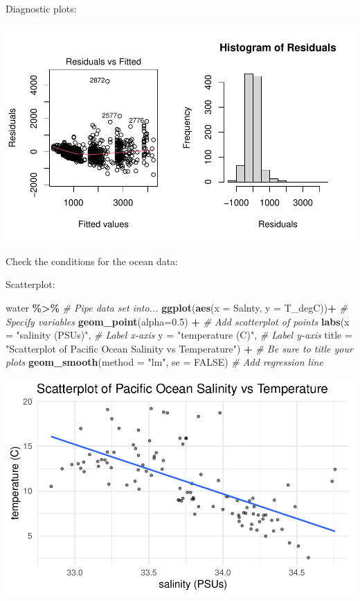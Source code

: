 \documentclass[
]{report}
\newenvironment{Shaded}{\begin{snugshade}}{\end{snugshade}}
\newcommand{\AttributeTok}[1]{\textcolor[rgb]{0.13,0.29,0.53}{#1}}
\newcommand{\CommentTok}[1]{\textcolor[rgb]{0.56,0.35,0.01}{\textit{#1}}}
\newcommand{\ConstantTok}[1]{\textcolor[rgb]{0.56,0.35,0.01}{#1}}
\newcommand{\FloatTok}[1]{\textcolor[rgb]{0.00,0.00,0.81}{#1}}
\newcommand{\FunctionTok}[1]{\textcolor[rgb]{0.13,0.29,0.53}{\textbf{#1}}}
\newcommand{\NormalTok}[1]{#1}
\newcommand{\SpecialCharTok}[1]{\textcolor[rgb]{0.81,0.36,0.00}{\textbf{#1}}}
\newcommand{\StringTok}[1]{\textcolor[rgb]{0.31,0.60,0.02}{#1}}
\begin{document}
Diagnostic plots:

\begin{center}\includegraphics[width=0.7\linewidth]{13-LN013-regression_files/figure-latex/unnamed-chunk-9-1} \end{center}

Check the conditions for the ocean data:

Scatterplot:

\begin{Shaded}
\begin{Highlighting}[]
\NormalTok{water }\SpecialCharTok{\%\textgreater{}\%} \CommentTok{\# Pipe data set into...}
\FunctionTok{ggplot}\NormalTok{(}\FunctionTok{aes}\NormalTok{(}\AttributeTok{x =}\NormalTok{ Salnty, }\AttributeTok{y =}\NormalTok{ T\_degC))}\SpecialCharTok{+}  \CommentTok{\# Specify variables}
  \FunctionTok{geom\_point}\NormalTok{(}\AttributeTok{alpha=}\FloatTok{0.5}\NormalTok{) }\SpecialCharTok{+}  \CommentTok{\# Add scatterplot of points}
  \FunctionTok{labs}\NormalTok{(}\AttributeTok{x =} \StringTok{"salinity (PSUs)"}\NormalTok{,  }\CommentTok{\# Label x{-}axis}
       \AttributeTok{y =} \StringTok{"temperature (C)"}\NormalTok{,  }\CommentTok{\# Label y{-}axis}
       \AttributeTok{title =} \StringTok{"Scatterplot of Pacific Ocean Salinity vs Temperature"}\NormalTok{) }\SpecialCharTok{+} 
               \CommentTok{\# Be sure to title your plots}
  \FunctionTok{geom\_smooth}\NormalTok{(}\AttributeTok{method =} \StringTok{"lm"}\NormalTok{, }\AttributeTok{se =} \ConstantTok{FALSE}\NormalTok{)  }\CommentTok{\# Add regression line}
\end{Highlighting}
\end{Shaded}

\begin{center}\includegraphics[width=0.7\linewidth]{13-LN013-regression_files/figure-latex/unnamed-chunk-10-1} \end{center}
\end{document}

